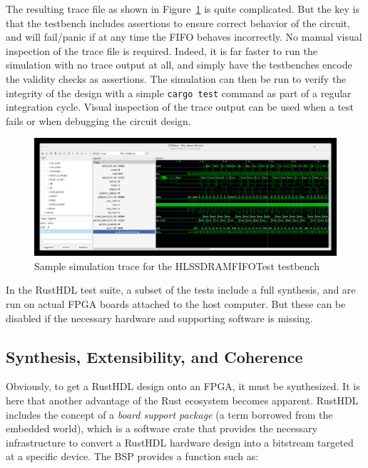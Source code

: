 \documentclass[conference]{IEEEtran}
\begin{document}
The resulting trace file as shown in Figure~\ref{fig:trace} is quite complicated.  But the key is that
the testbench includes assertions to ensure correct behavior of the circuit, and will fail/panic 
if at any time the FIFO behaves incorrectly.  No manual visual inspection of the trace file is
required.  Indeed, it is far faster to run the simulation with no trace output at all, and simply 
have the testbenches encode the validity checks as assertions. The 
simulation can then be run to verify the integrity of the design with a simple \verb|cargo test| command 
as part of a regular integration cycle.  Visual inspection of the trace output can be used when 
a test fails or when debugging the circuit design.

\begin{figure}[htbp]
  \centerline{\includegraphics[width=18cm]{hls_sdram_fifo.png}}
  \caption{Sample simulation trace for the \textrm{HLSSDRAMFIFOTest} testbench}
  \label{fig:trace}
\end{figure}
  
In the RustHDL test suite, a subset of the tests include a full synthesis, and are run on
actual FPGA boards attached to the host computer.  But these can be disabled if the necessary 
hardware and supporting software is missing.

\subsection{Synthesis, Extensibility, and Coherence}

Obviously, to get a RustHDL design onto an FPGA, it must be synthesized.  It is here that another 
advantage of the Rust ecosystem becomes apparent.  RustHDL includes the concept of a \emph{board support package} 
(a term borrowed from the embedded world), which is a software crate that provides the necessary infrastructure to
convert a RustHDL hardware design into a bitstream targeted at a specific device.  The BSP provides a function such 
as:
\end{document}
